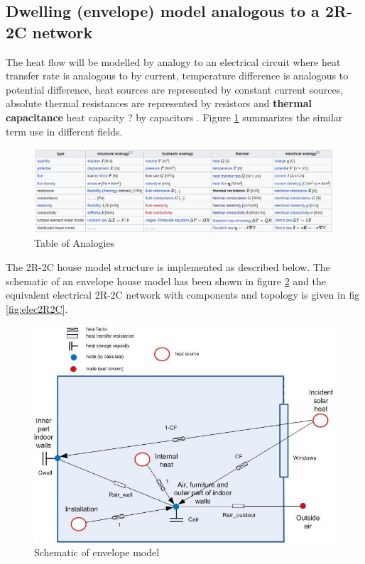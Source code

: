 \subsection{Dwelling (envelope) model analogous to a 2R-2C network}

The heat flow will be modelled by analogy to an electrical circuit where heat transfer rate is analogous to by current, temperature difference is analogous to potential difference, heat sources are represented by constant current sources, absolute thermal resistances are represented by resistors and \textbf{thermal capacitance} heat capacity ? by capacitors \cite{AbsTR}. Figure \ref{fig:Analogies} summarizes the similar term use in different fields.

\begin{figure}[H]
	\centering
	\includegraphics[width=1.0\columnwidth]{Pictures/Analogies.png}
	\caption[Short title]{Table of Analogies  \cite{AbsTR}}
	\label{fig:Analogies}
	\end{figure} 

The 2R-2C house model structure is implemented as described below. The schematic of an envelope house model has been shown in figure  \ref{fig:envelope2R2C} and the equivalent electrical 2R-2C network with components and topology is given in fig  \ref{fig:elec2R2C}.

\begin{figure}[H]
	\centering
	\includegraphics[width=1.0\columnwidth]{Pictures/envelopRC.jpg}
	\caption[Short title]{Schematic of envelope model}
	\label{fig:envelope2R2C}
	\end{figure} 
	


